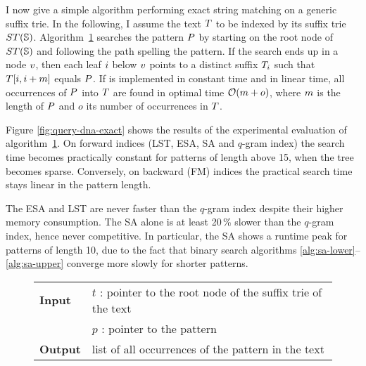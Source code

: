 I now give a simple algorithm performing exact string matching on a generic suffix trie.
In the following, I assume the text $T$ to be indexed by its suffix trie $ST(\mathbb{S})$.
Algorithm~\ref{alg:st-exact} searches the pattern $P$ by starting on the root node of $ST(\mathbb{S})$ and following the path spelling the pattern.
If the search ends up in a node $v$, then each leaf $i$ below $v$ points to a distinct suffix $T_{i}$ such that $T[i,i+m]$ equals $P$.
If  is implemented in constant time and  in linear time, all occurrences of $P$ into $T$ are found in optimal time $\mathcal{O}(m+o)$, where $m$ is the length of $P$ and $o$ its number of occurrences in $T$.

Figure \ref{fig:query-dna-exact} shows the results of the experimental evaluation of algorithm~\ref{alg:st-exact}.
On forward indices (LST, ESA, SA and $q$-gram index) the search time becomes practically constant for patterns of length above 15, \ie when the tree becomes sparse.
Conversely, on backward (FM) indices the practical search time stays linear in the pattern length. 

The ESA and LST are never faster than the $q$-gram index despite their higher memory consumption.
The SA alone is at least 20\,\% slower than the $q$-gram index, hence never competitive.
In particular, the SA shows a runtime peak for patterns of length 10, due to the fact that binary search algorithms \ref{alg:sa-lower}--\ref{alg:sa-upper} converge more slowly for shorter patterns.

\begin{figure*}[t]
\begin{center}
\begin{minipage}[t]{.8\textwidth}
\begin{algorithm}[H]
\begin{tabular}{ll}
\textbf{Input}  & $t$ : pointer to the root node of the suffix trie of the text\\
				& $p$ : pointer to the pattern\\
\textbf{Output} & list of all occurrences of the pattern in the text\\
\end{tabular}
\begin{algorithmic}[1]
	\State \Report {}
		\State {}
\EndIf
\end{algorithmic}
\label{alg:st-exact}
\end{algorithm}
\end{minipage}
\end{center}
\end{figure*}

